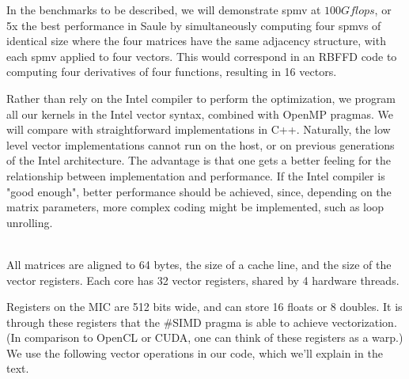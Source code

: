 In the benchmarks to be described, we will demonstrate spmv at $100 Gflops$, or 5x the best performance in Saule \etal by simultaneously computing four spmvs of identical size where the four matrices have the same adjacency structure, with each spmv applied to four vectors. This would correspond in an RBFFD code to computing four derivatives of four functions, resulting in 16 vectors. 

Rather than rely on the Intel compiler to perform the optimization, we program all our kernels in the Intel vector  syntax, combined with OpenMP pragmas. We will compare with straightforward implementations in C++. Naturally, the low level vector implementations cannot run on the host, or on previous generations of the Intel architecture. The advantage is that one gets a better feeling for the relationship between implementation and performance. If the Intel compiler is "good enough", better performance should be achieved, since, depending on the matrix parameters, more complex coding might be implemented, such as loop unrolling. 


 \\
All matrices are aligned to 64 bytes, the size of a cache line, and the size of the vector registers. 
Each core has 32 vector registers, shared by 4 hardware threads. 
 

Registers on the MIC are 512 bits wide, and can store 16 floats or 8 doubles. It is through these registers that the \#SIMD pragma is able to achieve vectorization. (In comparison to OpenCL or CUDA, one can think of these registers as a warp.) 
We use the following vector operations in our code, which we'll explain in the text. 

